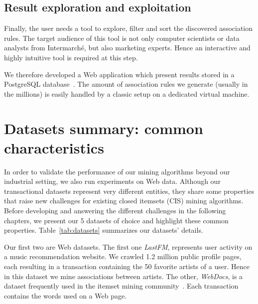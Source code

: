 


\subsection{Result exploration and exploitation}

Finally, the user needs a tool to explore, filter and sort the discovered association rules.
The target audience of this tool is not only computer scientists
or data analysts from Intermarch\'e, but also marketing experts.
Hence an interactive and highly intuitive tool is required at this step.

We therefore developed a Web application which present results stored in a PostgreSQL database~\cite{postgres}.
The amount of association rules we generate (usually in the millions)
is easily handled by a classic setup on a dedicated virtual machine.


\vfill
\pagebreak

\section{Datasets summary: common characteristics}
\label{sec:model:conc}



In order to validate the performance of our mining algorithms beyond our industrial setting,
we also run experiments on Web data.
Although our transactional datasets represent very different entities,
they share some properties that raise new challenges for existing closed itemsets (CIS) mining algorithms.
Before developing and answering the different challenges in the following chapters,
we present our 5 datasets of choice and highlight these common properties.
Table~\ref{tab:datasets} summarizes our datasets' details.

Our first two are Web datasets. %
The first one {\em LastFM}, represents user activity on a music recommendation website.
We crawled 1.2 million public profile pages,
each resulting in a transaction containing the 50 favorite artists of a user.
Hence in this dataset we mine associations between artists.
The other, {\em WebDocs}, is a dataset frequently used in the itemset mining community~\cite{LuccheseFIMI04}.
 Each transaction contains the words used on a Web page.


